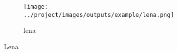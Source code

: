 \begin{figure}[!ht]
   \centering
\begin{subfigure}[t]{0.30\textwidth}
    \texttt{[image: ../project/images/outputs/example/lena.png]}
    \caption{lena}
    \centering
  \end{subfigure}
 \caption{Lena}
 \end{figure}
